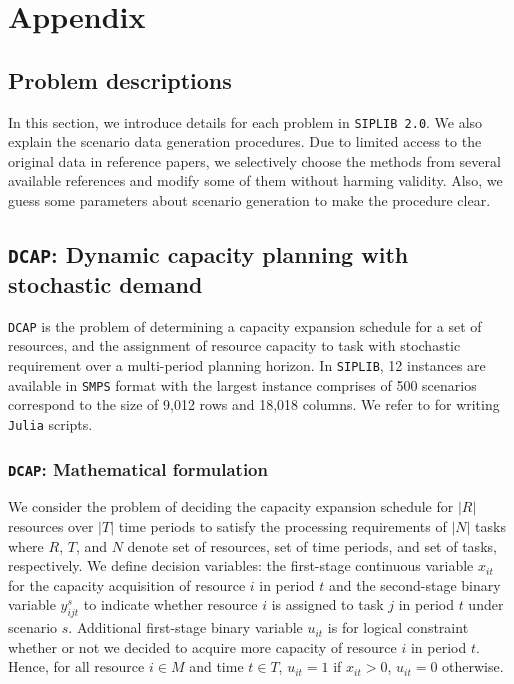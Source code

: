 \section*{Appendix}
\subsection*{Problem descriptions} \label{sec:prob_desc}

In this section, we introduce details for each problem in \texttt{SIPLIB 2.0}. We also explain the scenario data generation procedures. Due to limited access to the original data in reference papers, we selectively choose the methods from several available references and modify some of them without harming validity. Also, we guess some parameters about scenario generation to make the procedure clear.  %

\subsection{\texttt{DCAP}: Dynamic capacity planning with stochastic demand}
\texttt{DCAP} is the problem of determining a capacity expansion schedule for a set of resources, and the assignment of resource capacity to task with stochastic requirement over a multi-period planning horizon. In \texttt{SIPLIB}, 12 instances are available in \texttt{SMPS} format with the largest instance comprises of 500 scenarios correspond to the size of 9,012 rows and 18,018 columns. We refer to \cite{journal:AG2004} for writing \texttt{Julia} scripts.
\subsubsection{\texttt{DCAP}: Mathematical formulation}
We consider the problem of deciding the capacity expansion schedule for $|R|$ resources over $|T|$ time periods to satisfy the processing requirements of $|N|$ tasks where $R$, $T$, and $N$ denote set of resources, set of time periods, and set of tasks, respectively. We define decision variables: the first-stage continuous variable $x_{it}$ for the capacity acquisition of resource $i$ in period $t$ and the second-stage binary variable $y_{ijt}^s$ to indicate whether resource $i$ is assigned to task $j$ in period $t$ under scenario $s$. Additional first-stage binary variable $u_{it}$ is for logical constraint whether or not we decided to acquire more capacity of resource $i$ in period $t$. Hence, for all resource $i\in M$ and time $t\in T$, $u_{it}=1$ if $x_{it}>0$, $u_{it}=0$ otherwise. 

